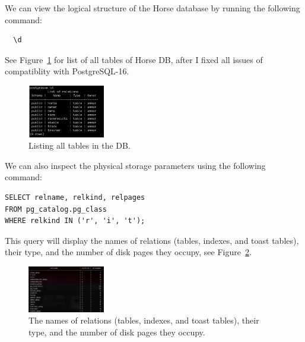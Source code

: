 \documentclass{article}
\begin{document}
We can view the logical structure of the Horse database by running the following command:
\begin{lstlisting}
  \d
\end{lstlisting}
See Figure~\ref{fig:list tables} for list of all tables of Horse DB, after I fixed all issues of compatiblity with PostgreSQL-16.
\begin{figure}[!h]
	\centering
	\includegraphics[width=0.3\textwidth]{figures/list_all_tables.png}
	\caption{Listing all tables in the DB.}
	\label{fig:list tables}
\end{figure}

We can also inspect the physical storage parameters using the following command:
\begin{lstlisting}
SELECT relname, relkind, relpages
FROM pg_catalog.pg_class
WHERE relkind IN ('r', 'i', 't');
\end{lstlisting}
This query will display the names of relations (tables, indexes, and toast tables), their type, and the number of disk pages they occupy, see Figure~\ref{fig:index info}.
\begin{figure}[!h]
	\centering
	\includegraphics[width=0.3\textwidth]{figures/index_info.png}
	\caption{The names of relations (tables, indexes, and toast tables), their type, and the number of disk pages they occupy.}
	\label{fig:index info}
\end{figure}
\end{document}
